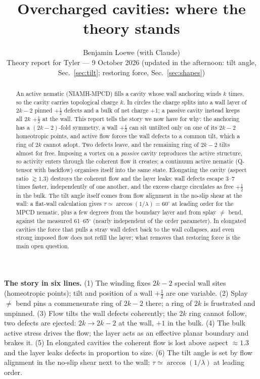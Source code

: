 \documentclass[11pt,a4paper]{article}
\title{Overcharged cavities: where the theory stands}
\author{Benjamin Loewe (with Claude)\\[2pt]\small Theory report for Tyler --- 9 October 2026 (updated in the afternoon: tilt angle, Sec.~\ref{sec:tilt}; restoring force, Sec.~\ref{sec:shapes})}
\date{}
\newcommand{\half}{\tfrac12}
\newcommand{\keybox}[1]{\par\smallskip\noindent\colorbox{black!6}{\parbox{\dimexpr\linewidth-2\fboxsep}{\small #1}}\par\smallskip}
\begin{document}
\maketitle

\begin{abstract}
\noindent
An active nematic (NIAMH-MPCD) fills a cavity whose wall anchoring winds $k$ times, so the cavity carries topological charge $k$.
In circles the charge splits into a wall layer of $2k-2$ pinned $+\half$ defects and a bulk of net charge $+1$; a passive cavity instead keeps
all $2k$ $+\half$ at the wall. This report tells the story we now have for why: the anchoring has a $(2k-2)$-fold symmetry, a
wall $+\half$ can sit untilted only on one of its $2k-2$ homeotropic points, and active flow forces the wall defects to a common tilt, which a
ring of $2k$ cannot adopt. Two defects leave, and the remaining ring of $2k-2$ tilts almost for free. Imposing a vortex on a \emph{passive} cavity
reproduces the active structure, so activity enters through the coherent flow it creates; a continuum active nematic (Q-tensor with backflow) organises itself into the same state. Elongating the cavity (aspect ratio $\gtrsim1.3$) destroys
the coherent flow and the layer leaks: wall defects escape 3--7 times faster, independently of one another, and the excess charge circulates as free $+\half$ in
the bulk. The tilt angle itself comes from flow alignment in the no-slip shear at the wall: a flat-wall calculation gives $\tau\simeq\arccos(1/\lambda)=60^\circ$ at leading order for the MPCD nematic, plus a few degrees from the boundary layer and from splay $\neq$ bend, against the measured 61--65$^\circ$ (nearly independent of the order parameter). In elongated cavities the force that pulls a stray wall defect back to the wall collapses, and even strong imposed flow does not refill the layer; what removes that restoring force is the main open question.
\end{abstract}

\keybox{\textbf{The story in six lines.}
(1) The winding fixes $2k-2$ special wall sites (homeotropic points); tilt and position of a wall $+\half$ are one variable.
(2) Splay $\neq$ bend pins a commensurate ring of $2k-2$ there; a ring of $2k$ is frustrated and unpinned.
(3) Flow tilts the wall defects coherently; the $2k$ ring cannot follow, two defects are ejected: $2k\to2k-2$ at the wall, $+1$ in the bulk.
(4) The bulk active stress drives the flow; the layer acts as an effective planar boundary and brakes it.
(5) In elongated cavities the coherent flow is lost above aspect $\approx1.3$ and the layer leaks defects in proportion to size.
(6) The tilt angle is set by flow alignment in the no-slip shear next to the wall: $\tau\simeq\arccos(1/\lambda)$ at leading order.}
\end{document}
